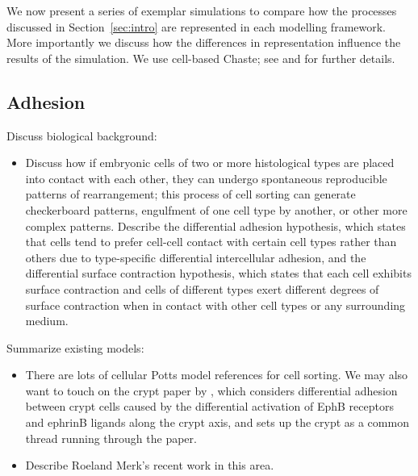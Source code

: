 \documentclass[12pt]{article}
\begin{document}
We now present a series of exemplar simulations to compare how the processes discussed in Section~\ref{sec:intro} are represented in each modelling framework.
More importantly we discuss how the differences in representation influence the results of the simulation. 
We use cell-based Chaste; see \citet{Mirams2013Chaste} and \citet{Pitt-Francis2012Chaste} for further details.


\subsection{Adhesion} \label{sec:adhesion}

Discuss biological background:
\begin{itemize}
\item Discuss how if embryonic cells of two or more histological types are placed into contact with each other, they can undergo spontaneous reproducible patterns of rearrangement; this process of cell sorting can generate checkerboard patterns, engulfment of one cell type by another, or other more complex patterns. Describe the differential adhesion hypothesis, which states that cells tend to prefer cell-cell contact with certain cell types rather than others due to type-specific differential intercellular adhesion, and the differential surface contraction hypothesis, which states that each cell exhibits surface contraction and cells of different types exert different degrees of surface contraction when in contact with other cell types or any surrounding medium.
\end{itemize}

\noindent Summarize existing models:
\begin{itemize}
\item There are lots of cellular Potts model references for cell sorting. We may also want to touch on the crypt paper by \citet{Wong2010Computational}, which considers differential adhesion between crypt cells caused by the differential activation of EphB receptors and ephrinB ligands along the crypt axis, and sets up the crypt as a common thread running through the paper.
\item Describe Roeland Merk's recent work in this area.
\end{itemize}
\end{document}
